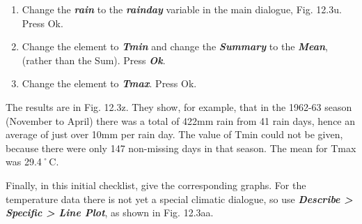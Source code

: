 \documentclass[
  letterpaper,
  DIV=11,
  numbers=noendperiod]{scrreprt}
\begin{document}
\begin{enumerate}
\def\labelenumi{\alph{enumi})}
\item
  Change the \textbf{\emph{rain}} to the \textbf{\emph{rainday}}
  variable in the main dialogue, Fig. 12.3u. Press Ok.
\item
  Change the element to \textbf{\emph{Tmin}} and change the
  \textbf{\emph{Summary}} to the \textbf{\emph{Mean}}, (rather than the
  Sum). Press \textbf{\emph{Ok}}.
\item
  Change the element to \textbf{\emph{Tmax}}. Press Ok.
\end{enumerate}

The results are in Fig. 12.3z. They show, for example, that in the
1962-63 season (November to April) there was a total of 422mm rain from
41 rain days, hence an average of just over 10mm per rain day. The value
of Tmin could not be given, because there were only 147 non-missing days
in that season. The mean for Tmax was 29.4˚C.

Finally, in this initial checklist, give the corresponding graphs. For
the temperature data there is not yet a special climatic dialogue, so
use \textbf{\emph{Describe \textgreater{} Specific \textgreater{} Line
Plot}}, as shown in Fig. 12.3aa.
\end{document}
